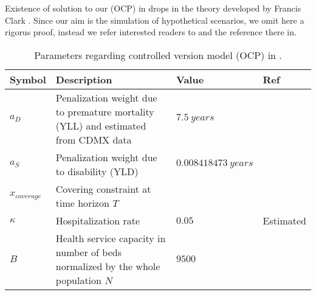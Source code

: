 Existence of solution to our (OCP) in
 drops in the theory
developed by Francis Clark
\cite[see e.g.][Thm. 23.11]{Clarke2013}. Since our aim is the simulation of
hypothetical scenarios,
we omit here a rigorus proof, instead we refer interested readers to
\cite{Sethi1995,Lenhart2007} and the reference
there in.

\begin{table}[htb]
    \centering
    \begin{tabular}{%
            >{\centering}
            p{}
            p{}
            p{}
            p{}
        }
        \toprule
        \textbf{Symbol}
        & \textbf{Description}
        & \textbf{Value}
        & \textbf{Ref}
        \\
        \midrule
        $a_D$
        &
        Penalization weight due to  premature mortality (YLL)
        and estimated from CDMX data
        & $\SI{7.5}{years}$ & \cite{WhoDALY,DataMX}
        \\
        $a_S$
        &
        Penalization weight due to disability (YLD)
        & $\SI{0.008418473}{years}$ & \cite{Jo2020}
        \\
        $x_{coverage}$
        &
        Covering constraint at time horizon $T$
        & & \cite{sage2020}

        \\
        $\kappa$
        &
        Hospitalization rate
        &
        $0.05$
        &
        Estimated
        \\
        $B$
        &
        Health service capacity in number of beds
        normalized by the whole
        population $N$
        &
        $9500$
        &

        \\
        \bottomrule
    \end{tabular}
    \caption{
        Parameters regarding
        controlled version model (OCP) in .
    }
    \label{tbl:ocp_parameters_description}
\end{table}
